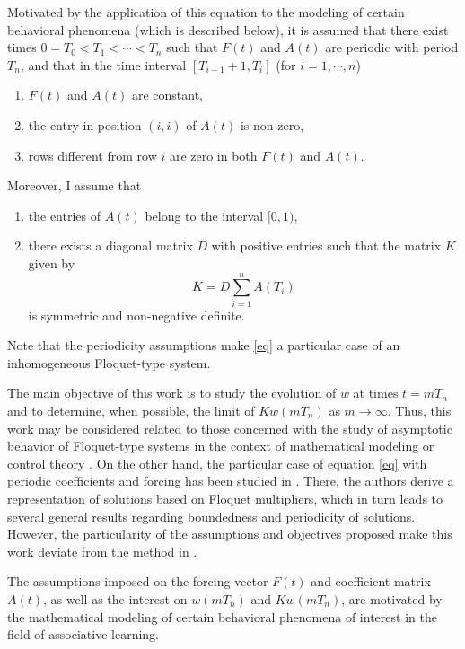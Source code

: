 \documentclass[]{interact}
\theoremstyle{plain}%
\theoremstyle{definition}
\theoremstyle{remark}
\begin{document}
Motivated by the application of this equation to the modeling of certain behavioral phenomena (which is described below), it is assumed that there exist times $0=T_0<T_1<\cdots<T_n$ such that $F(t)$ and $A(t)$ are periodic with period $T_n$, and that in the time interval $[T_{i-1}+1, T_i]$ (for $i=1,\cdots,n$)
\begin{enumerate}
\item[i)] $F(t)$ and $A(t)$ are constant,
\item[ii)] the entry in position $(i,i)$ of $A(t)$ is non-zero,
\item[iii)] rows different from row $i$ are zero in both $F(t)$ and $A(t)$.
\end{enumerate}
Moreover, I assume that
\begin{enumerate}
\item[iv)] the entries of $A(t)$ belong to the interval $[0,1)$,
\item[v)] there exists a diagonal matrix $D$ with positive entries such that the matrix $K$ given by
\[
K=D\sum_{i=1}^{n}A(T_i)
\]
is symmetric and non-negative definite.
\end{enumerate}
Note that the periodicity assumptions make \eqref{eq} a particular case of an inhomogeneous Floquet-type system. 

The main objective of this work is to study the evolution of $w$ at times $t=mT_n$ and to determine, when possible, the limit of $Kw(mT_n)$ as $m\rightarrow \infty$. Thus, this work may be considered related to those concerned with the study of asymptotic behavior of Floquet-type systems in the context of mathematical modeling \cite{SGMNP16,K22,ST11} or control theory \cite{DT98,LY97}. On the other hand, the particular case of equation \eqref{eq} with periodic coefficients and forcing has been studied in \cite{NNS08}. There, the authors derive a representation of solutions based on Floquet multipliers, which in turn leads to several general results regarding boundedness and periodicity of solutions. However, the particularity of the assumptions and objectives proposed make this work deviate from the method in \cite{NNS08}.   

The assumptions imposed on the forcing vector $F(t)$ and coefficient matrix $A(t)$, as well as the interest on $w(mT_n)$ and $Kw(mT_n)$, are motivated by the mathematical modeling of certain behavioral phenomena of interest in the field of associative learning. 
\end{document}
